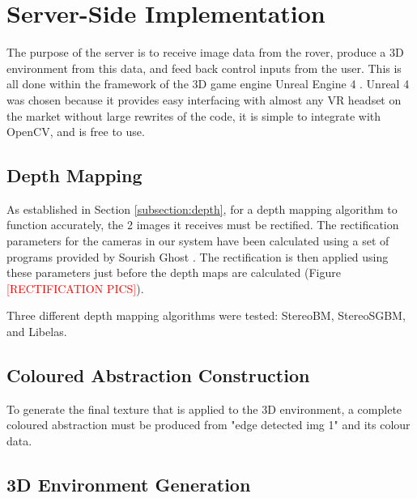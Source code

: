 \chapter{Server-Side Implementation}
\label{chapter:server}


The purpose of the server is to receive image data from the rover, produce a 3D environment from this data, and feed back control inputs from the user. This is all done within the framework of the 3D game engine Unreal Engine 4 \cite{unreal}. Unreal 4 was chosen because it provides easy interfacing with almost any VR headset on the market without large rewrites of the code, it is simple to integrate with OpenCV, and is free to use.

\section{Depth Mapping}

As established in Section \ref{subsection:depth}, for a depth mapping algorithm to function accurately, the 2 images it receives must be rectified. The rectification parameters for the cameras in our system have been calculated using a set of programs provided by Sourish Ghost \cite{calibgit}. The rectification is then applied using these parameters just before the depth maps are calculated (Figure \textcolor{red}{[RECTIFICATION PICS]}).

Three different depth mapping algorithms were tested: StereoBM, StereoSGBM, and Libelas.

\section{Coloured Abstraction Construction}

To generate the final texture that is applied to the 3D environment, a complete coloured abstraction must be produced from "edge detected img 1" and its colour data.

\section{3D Environment Generation}

